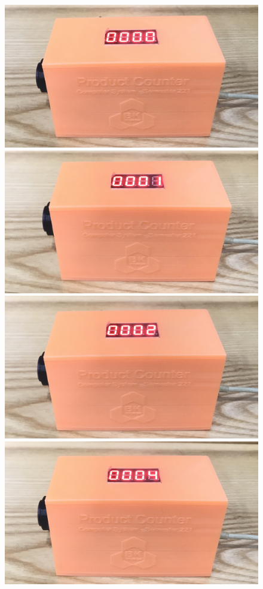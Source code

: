 \documentclass[13pt,a4paper,twoside]{report}
\begin{document}
\begin{figure}[H]
\centering
\includegraphics[scale=0.08]{images/counter_0.jpg}
\includegraphics[scale=0.08]{images/counter_1.jpg}
\includegraphics[scale=0.08]{images/counter_2.jpg}\\
\includegraphics[scale=0.08]{images/counter_4.jpg}

\end{figure}
\end{document}
